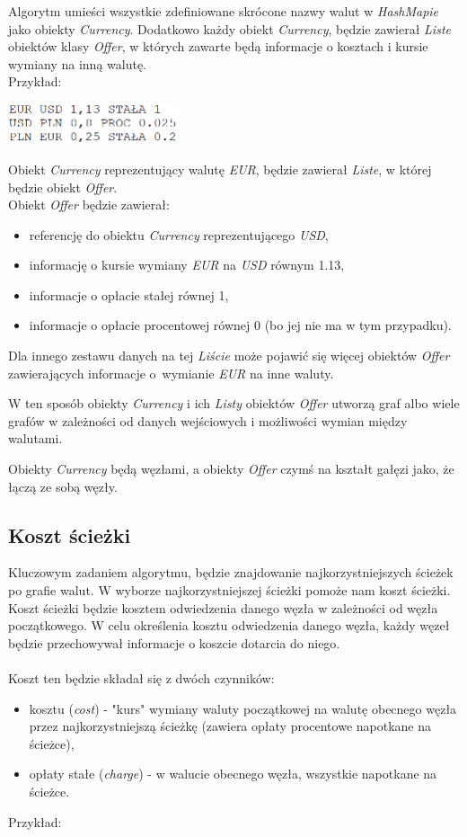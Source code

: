 \documentclass[a4paper,11pt]{article}
\begin{document}
Algorytm umieści wszystkie zdefiniowane skrócone nazwy walut w \textit{HashMapie} jako obiekty \textit{Currency}. Dodatkowo każdy obiekt \textit{Currency}, będzie zawierał \textit{Liste} obiektów klasy \textit{Offer}, w których zawarte będą informacje o kosztach i kursie wymiany na inną walutę.
\\Przykład:
\begin{center}
\includegraphics[width = 5cm]{Przyklad}
\end{center}

Obiekt \textit{Currency} reprezentujący walutę \textit{EUR}, będzie zawierał \textit{Liste}, w której będzie obiekt \textit{Offer}.
\\Obiekt \textit{Offer} będzie zawierał:
\begin{itemize}
\item referencję do obiektu \textit{Currency} reprezentującego \textit{USD},
\item informację o kursie wymiany \textit{EUR} na \textit{USD} równym 1.13,
\item informacje o opłacie stałej równej 1,
\item informacje o opłacie procentowej równej 0 (bo jej nie ma w tym przypadku).
\end{itemize} 

Dla innego zestawu danych na tej \textit{Liście} może pojawić się więcej obiektów \textit{Offer} zawierających informacje o~wymianie \textit{EUR} na inne waluty.

W ten sposób obiekty \textit{Currency} i ich \textit{Listy} obiektów \textit{Offer} utworzą graf albo wiele grafów w zależności od danych wejściowych i możliwości wymian między walutami.

Obiekty \textit{Currency} będą węzłami, a obiekty \textit{Offer} czymś na kształt gałęzi jako, że łączą ze sobą węzły.

\subsection{Koszt ścieżki}
Kluczowym zadaniem algorytmu, będzie znajdowanie najkorzystniejszych ścieżek po grafie walut. W wyborze najkorzystniejszej ścieżki pomoże nam koszt ścieżki.
Koszt ścieżki będzie kosztem odwiedzenia danego węzła w zależności od węzła początkowego. W celu określenia kosztu odwiedzenia danego węzła, każdy węzeł będzie przechowywał informacje o koszcie dotarcia do niego.
\\\\Koszt ten będzie składał się z dwóch czynników:
\begin{itemize}
\item kosztu (\textit{cost}) - "kurs" wymiany waluty początkowej na walutę obecnego węzła przez najkorzystniejszą ścieżkę (zawiera opłaty procentowe napotkane na ścieżce),
\item opłaty stałe (\textit{charge}) - w walucie obecnego węzła, wszystkie napotkane na ścieżce.
\end{itemize}
Przykład:
\end{document}
